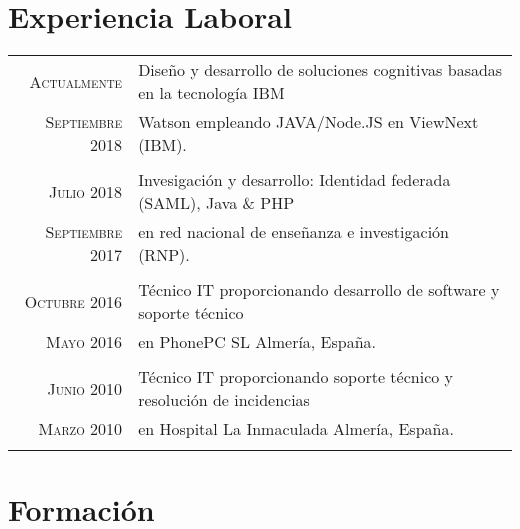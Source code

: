 \documentclass[a4paper,10pt]{article}
\begin{document}
\section*{Experiencia Laboral}
\begin{tabular}{r|p{11cm}}

\textsc {Actualmente} & Diseño y desarrollo de soluciones cognitivas basadas en la tecnología IBM 
\\\textsc{Septiembre 2018} &  Watson  empleando JAVA/Node.JS en ViewNext (IBM).  
\normalsize \\\multicolumn{2}{c}{} \\


\textsc {Julio 2018} & Invesigación y desarrollo: Identidad federada (SAML), Java \& PHP
\\\textsc{Septiembre 2017} & en red nacional de enseñanza e investigación (RNP).  \normalsize \\\multicolumn{2}{c}{} \\

\textsc{Octubre} 2016 & Técnico IT proporcionando desarrollo de software y soporte técnico\\\textsc{Mayo 2016} & en PhonePC SL Almería, España. \normalsize \\\multicolumn{2}{c}{} \\


\textsc{Junio} 2010 & Técnico IT proporcionando soporte técnico y resolución de incidencias\\\textsc{Marzo 2010} & en Hospital La Inmaculada Almería, España. \normalsize \\\multicolumn{2}{c}{} \\


\end{tabular}

\section*{Formación}
\end{document}

